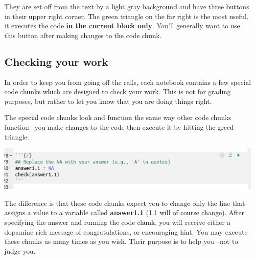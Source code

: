 \documentclass[11pt]{article}
\begin{document}
They are set off from the text by a light gray background and have three buttons in their upper right corner.  The green triangle on the far right is the most useful, it executes the code \textbf{in the current block only}. You'll generally want to use this button after making changes to the code chunk.

\subsection{Checking your work}

In order to keep you from going off the rails, each notebook contains a few special code chunks which are designed to check your work. This is not for grading purposes, but rather to let you know that you are doing things right.

The special code chunks look and function the same way other code chunks function-- you make changes to the code then execute it by hitting the greed triangle.

\includegraphics[scale=.5]{RstudioCheck}

The difference is that these code chunks expect you to change only the line that assigns a value to a variable called \textbf{answer1.1} (1.1 will of course change).  After specifying the answer and running the code chunk, you will receive either a dopamine rich message of congratulations, or encouraging hint.  You may execute these chunks as many times as you wish. Their purpose is to help you --not to judge you.
\end{document}
